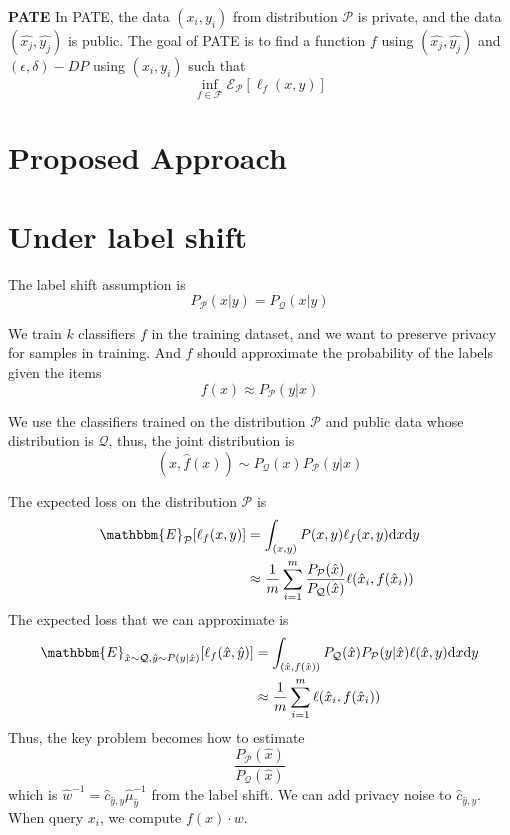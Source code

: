 \documentclass{article}
\def\cE{\mathcal{E}}
\theoremstyle{definition}
\begin{document}
\textbf{PATE}
In PATE, the data $(x_i, y_i)$ from distribution $\mathcal{P}$ is private, and the data $(\hat{x_j}, \hat{y_j})$ is public. The goal of PATE is to find a function $f$ using $(\hat{x_j}, \hat{y_j})$ and $(\epsilon,\delta)-DP$ using $(x_i, y_i)$ such that
\[
\inf_{f\in \mathcal{F}} \cE_{\mathcal{P}}[ \ell_f (x,y)]
\]

\section{Proposed Approach}


\section{Under label shift}
The label shift assumption is
\[
P_{\mathcal{P}}(x|y) = P_{\mathcal{Q}}(x|y)
\]

We train $k$ classifiers $f$ in the training dataset, and we want to preserve privacy for samples in training. And $f$ should approximate the probability of the labels given the items
\[
f(x)\approx P_\mathcal{P}(y|x)
\]

We use the classifiers trained on the distribution $\mathcal{P}$ and public data whose distribution is $\mathcal{Q}$, thus, the joint distribution is
\[
(x,\hat{f}(x))\sim P_\mathcal{Q}(x)P_\mathcal{P}(y|x)
\]

The expected loss on the distribution $\mathcal{P}$ is
\begin{align*}
\mathbbm{E}_{\mathcal{P}}[\ell_f(x,y)]&=\int_{(x,y)}P(x,y)\ell_f(x,y){\rm d}x{\rm d}y\\
&\approx \frac{1}{m}\sum_{i=1}^m \frac{P_\mathcal{P}(\hat{x})}{P_\mathcal{Q}(\hat{x})}\ell(\hat{x}_i,f(\hat{x}_i))
\end{align*}
The expected loss that we can approximate is
\begin{align*}
\mathbbm{E}_{\hat{x}\sim \mathcal{Q},\hat{y}\sim P(y|\hat{x})}[\ell_f(\hat{x},\hat{y})]&=\int_{(\hat{x},f(\hat{x}))}P_\mathcal{Q}(\hat{x})P_\mathcal{P}(y|\hat{x})\ell(\hat{x},y){\rm d}x{\rm d}y\\
&\approx \frac{1}{m}\sum_{i=1}^{m}\ell(\hat{x}_i,f(\hat{x}_i))
\end{align*}
Thus, the key problem becomes how to estimate
\[
\frac{P_\mathcal{P}(\hat{x})}{P_\mathcal{Q}(\hat{x})}
\]
which is $\hat{w}^{-1}=\hat{c}_{\hat{y},y}\hat{\mu}^{-1}_{\hat{y}}$ from the label shift. We can add privacy noise to $\hat{c}_{\hat{y},y}$. When query $x_i$, we compute $f(x)\cdot w$.
\end{document}
